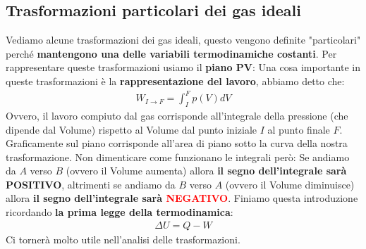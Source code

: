         \subsection{Trasformazioni particolari dei gas ideali}
            Vediamo alcune trasformazioni dei gas ideali, questo vengono definite "particolari" perché \textbf{mantengono una delle variabili termodinamiche costanti}. Per rappresentare queste trasformazioni usiamo il \textbf{piano PV}:
            Una cosa importante in queste trasformazioni è la \textbf{rappresentazione del lavoro}, abbiamo detto che:
            \begin{align*}
                W_{I\rightarrow F}= \int_I^Fp(V)dV
            \end{align*}
            Ovvero, il lavoro compiuto dal gas corrisponde all'integrale della pressione (che dipende dal Volume) rispetto al Volume dal punto iniziale $I$ al punto finale $F$. Graficamente sul piano corrisponde all'area di piano sotto la curva della nostra trasformazione. Non dimenticare come funzionano le integrali però:
            Se andiamo da $A$ verso $B$ (ovvero il Volume aumenta) allora \textbf{il segno dell'integrale sarà \textcolor{OliveGreen}{POSITIVO}}, altrimenti se andiamo da $B$ verso $A$ (ovvero il Volume diminuisce) allora \textbf{il segno dell'integrale sarà \textcolor{Red}{NEGATIVO}}.
            Finiamo questa introduzione ricordando \textbf{la prima legge della termodinamica}:
            \begin{align*}
                \Delta U=Q-W
            \end{align*}
            Ci tornerà molto utile nell'analisi delle trasformazioni.

